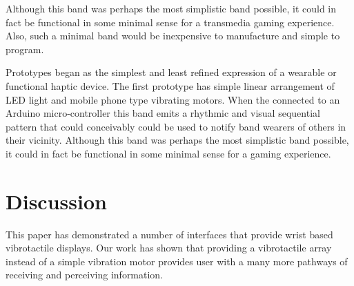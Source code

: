 \documentclass{chi-ext}
\begin{document}
Although this band was perhaps the most simplistic band possible, it could in fact be functional in some minimal sense for a transmedia gaming experience. Also, such a minimal band would be inexpensive to manufacture and simple to program. 

Prototypes began as the simplest and least refined expression of a wearable or functional haptic device. The first prototype has simple linear arrangement of LED light and mobile phone type vibrating motors. When the connected to an Arduino micro-controller this band emits a rhythmic and visual sequential pattern that could conceivably could be used to notify band wearers of others in their vicinity. Although this band was perhaps the most simplistic band possible, it could in fact be functional in some minimal sense for a gaming experience. 


\section{Discussion}
This paper has demonstrated a number of interfaces that provide wrist based vibrotactile displays. Our work has shown that providing a vibrotactile array instead of a simple vibration motor provides user with a many more pathways of receiving and perceiving information.
\end{document}

